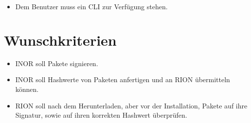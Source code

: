 \begin{itemize}
	\item Dem Benutzer muss ein CLI zur Verfügung stehen.
\end{itemize}

\section{Wunschkriterien}
\begin{itemize}
	\item INOR soll Pakete signieren.
	\item INOR soll Hashwerte von Paketen anfertigen und an RION übermitteln können.
	\item RION soll nach dem Herunterladen, aber vor der Installation, Pakete auf ihre Signatur, sowie auf ihren korrekten Hashwert überprüfen.

\end{itemize}
